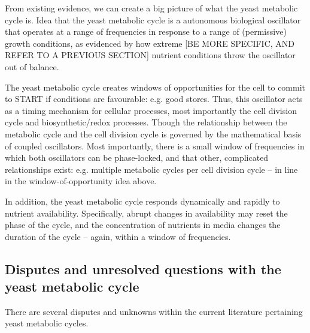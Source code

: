 From existing evidence, we can create a big picture of what the yeast metabolic cycle is.
Idea that the yeast metabolic cycle is a autonomous biological oscillator that operates at a range of frequencies in response to a range of (permissive) growth conditions, as evidenced by how extreme [BE MORE SPECIFIC, AND REFER TO A PREVIOUS SECTION] nutrient conditions throw the oscillator out of balance.

The yeast metabolic cycle creates windows of opportunities for the cell to commit to START if conditions are favourable: e.g. good stores.
Thus, this oscillator acts as a timing mechanism for cellular processes, most importantly the cell division cycle and biosynthetic/redox processes.
Though the relationship between the metabolic cycle and the cell division cycle is governed by the mathematical basis of coupled oscillators.
Most importantly, there is a small window of frequencies in which both oscillators can be phase-locked, and that other, complicated relationships exist: e.g. multiple metabolic cycles per cell division cycle -- in line in the window-of-opportunity idea above.

In addition, the yeast metabolic cycle responds dynamically and rapidly to nutrient availability.
Specifically, abrupt changes in availability may reset the phase of the cycle, and the concentration of nutrients in media changes the duration of the cycle -- again, within a window of frequencies.


\subsection{Disputes and unresolved questions with the yeast metabolic cycle}
\label{subsec:intro-ymc-unresolved}

There are several disputes and unknowns within the current literature pertaining yeast metabolic cycles.

